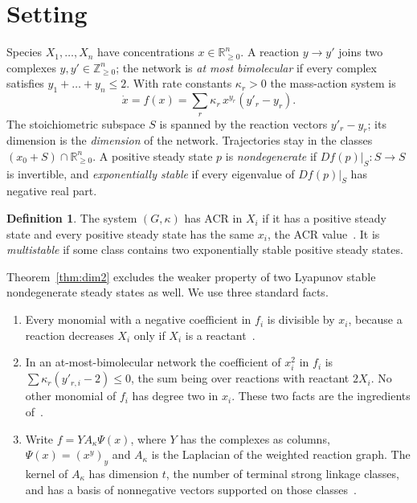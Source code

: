 \documentclass[11pt]{amsart}
\theoremstyle{definition}
\newtheorem{definition}[theorem]{Definition}
\theoremstyle{remark}
\newcommand{\R}{\mathbb R}
\begin{document}
\section{Setting}

Species $X_1,\dots,X_n$ have concentrations $x\in\R^n_{\ge0}$. A reaction $y\to y'$ joins two complexes $y,y'\in\mathbb Z_{\ge0}^n$; the network is \emph{at most bimolecular} if every complex satisfies $y_1+\dots+y_n\le2$. With rate constants $\kappa_r>0$ the mass-action system is
\[
 \dot x=f(x)=\sum_r\kappa_r\,x^{y_r}(y'_r-y_r).
\]
The stoichiometric subspace $S$ is spanned by the reaction vectors $y'_r-y_r$; its dimension is the \emph{dimension} of the network. Trajectories stay in the classes $(x_0+S)\cap\R^n_{\ge0}$. A positive steady state $p$ is \emph{nondegenerate} if $Df(p)|_S\colon S\to S$ is invertible, and \emph{exponentially stable} if every eigenvalue of $Df(p)|_S$ has negative real part.

\begin{definition}
The system $(G,\kappa)$ has ACR in $X_i$ if it has a positive steady state and every positive steady state has the same $x_i$, the ACR value~\cite{kns2024}. It is \emph{multistable} if some class contains two exponentially stable positive steady states.
\end{definition}

Theorem~\ref{thm:dim2} excludes the weaker property of two Lyapunov stable nondegenerate steady states as well. We use three standard facts.

\begin{enumerate}
\item[(F1)] Every monomial with a negative coefficient in $f_i$ is divisible by $x_i$, because a reaction decreases $X_i$ only if $X_i$ is a reactant~\cite[Lemma~2.3]{kns2024}.
\item[(F2)] In an at-most-bimolecular network the coefficient of $x_i^2$ in $f_i$ is $\sum\kappa_r(y'_{r,i}-2)\le0$, the sum being over reactions with reactant $2X_i$. No other monomial of $f_i$ has degree two in $x_i$. These two facts are the ingredients of~\cite[Lemma~3.11]{kns2024}.
\item[(F3)] Write $f=YA_\kappa\Psi(x)$, where $Y$ has the complexes as columns, $\Psi(x)=(x^y)_y$ and $A_\kappa$ is the Laplacian of the weighted reaction graph. The kernel of $A_\kappa$ has dimension $t$, the number of terminal strong linkage classes, and has a basis of nonnegative vectors supported on those classes~\cite{feinberg2019}.
\end{enumerate}
\end{document}

